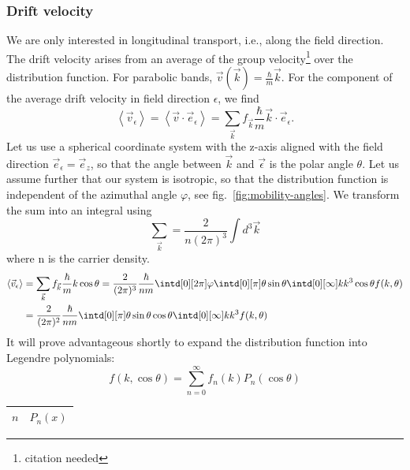 \documentclass[physics,phd,nolot,nolof]{uccthesis}%
\begin{document}
{\subsubsection{Drift velocity}
We are only interested in longitudinal transport, i.e., along the field direction.
The drift velocity arises from an average of the group velocity\footnote{citation needed} over the distribution function. 
For parabolic bands, $\vec v(\vec k) =\frac{\hbar}{m}\vec k$.
For the component of the average drift velocity in field direction $\epsilon$,
we find
\begin{equation}
 \left\langle   \vec v_\epsilon \right \rangle
 =\left\langle   \vec v \cdot \vec e_\epsilon \right \rangle
 = \sum\limits_{\vec k} f_{\vec k} \frac{\hbar}{m}\vec k\cdot \vec e_\epsilon.
  \label{eq:v-average}
\end{equation}
Let us use a spherical coordinate system with the z-axis aligned with the 
field direction $\vec e_{\epsilon} =\vec e_z$, so that the angle between $\vec k$
and $\vec \epsilon$ is the polar angle $\theta$.
Let us assume further that our system is isotropic, so that the distribution 
function is independent of the azimuthal angle $\varphi$, see fig.~\ref{fig:mobility-angles}.
We transform the sum into an integral using
$$\sum_{\vec k} = \frac{2}{n(2\pi)^3}\int d^3 \vec k$$
where n is the carrier density.
\begin{equation}
\begin{split}
 \left\langle   \vec v_\epsilon \right \rangle
& = \sum\limits_{\vec k} f_{\vec k} \frac{\hbar}{m} k \cos\theta
 = \frac{2 }{(2\pi)^3} \frac{\hbar}{n m}
 \intd[0][2\pi]\varphi
 \intd[0][\pi]\theta \sin\theta 
 \intd[0][\infty]k k^3 \cos \theta f(k, \theta)\\
& = \frac{2 }{(2\pi)^2} \frac{\hbar}{n m}
 \intd[0][\pi]\theta \sin\theta\cos\theta 
 \intd[0][\infty]k k^3 f(k,\theta)
\end{split}
  \label{eq:v-average2}
\end{equation}
It will prove advantageous shortly to expand the distribution function 
into Legendre polynomials\cite{abramowitzstegun72}:
\begin{equation}
  f(k,\cos\theta) = \sum_{n=0}^\infty f_n(k) P_n(\cos\theta)
  \label{eq:f-legendre}
\end{equation}
\begin{table}
  \centering
  \begin{tabular}{l c  }
   $n$	&	$P_n(x) $ \\\hline

\end{tabular}
\end{table}}
\end{document}
